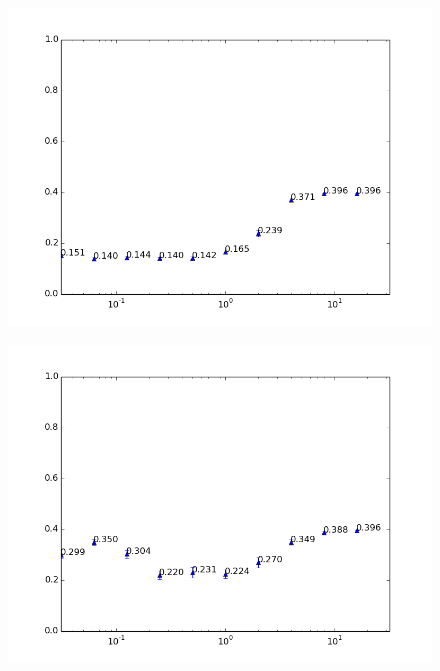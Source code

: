 \begin{figure}[h!]
	\centering
	\begin{minipage}{.49\linewidth}
		\includegraphics[width=\linewidth]{fig/spambase/eps2e10,budg=eps,peers50,groups2,reg2e-5-2e4-pubAll-LRbyCV-retuning}
		\label{fig:regularization_normalepsilon}
	\end{minipage}
	\hspace{.001\linewidth}
	\begin{minipage}{.49\linewidth}
		\includegraphics[width=\linewidth]{fig/spambase/eps0.1,budg=eps,peers50,groups2,reg2e-5-2e4-pubAll-LRbyCV-retuning}
		\label{fig:regularization_extremelyhighepsilon}
	\end{minipage}
\end{figure}

